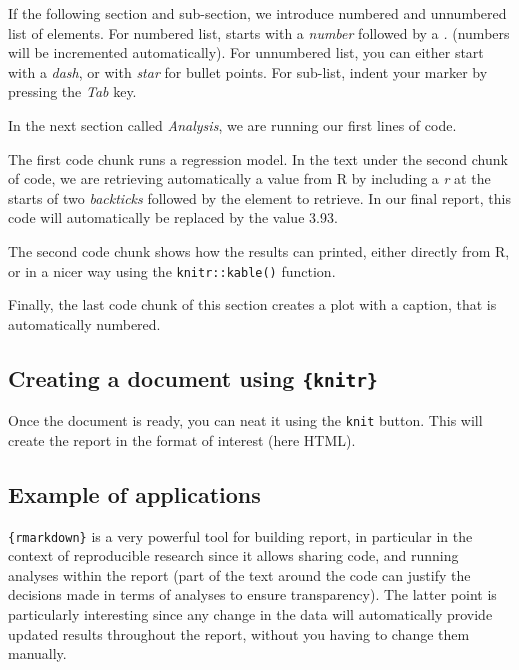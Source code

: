 \documentclass[
]{book}
\begin{document}
If the following section and sub-section, we introduce numbered and unnumbered list of elements. For numbered list, starts with a \emph{number} followed by a \emph{.} (numbers will be incremented automatically). For unnumbered list, you can either start with a \emph{dash}, or with \emph{star} for bullet points. For sub-list, indent your marker by pressing the \emph{Tab} key.

In the next section called \emph{Analysis}, we are running our first lines of code.

The first code chunk runs a regression model. In the text under the second chunk of code, we are retrieving automatically a value from R by including a \emph{r} at the starts of two \emph{backticks} followed by the element to retrieve. In our final report, this code will automatically be replaced by the value 3.93.

The second code chunk shows how the results can printed, either directly from R, or in a nicer way using the \texttt{knitr::kable()} function.

Finally, the last code chunk of this section creates a plot with a caption, that is automatically numbered.

\hypertarget{creating-a-document-using-knitr}{%
\subsection{\texorpdfstring{Creating a document using \texttt{\{knitr\}}}{Creating a document using \{knitr\}}}\label{creating-a-document-using-knitr}}

Once the document is ready, you can neat it using the \texttt{knit} button. This will create the report in the format of interest (here HTML).

\hypertarget{example-of-applications}{%
\subsection{Example of applications}\label{example-of-applications}}

\texttt{\{rmarkdown\}} is a very powerful tool for building report, in particular in the context of reproducible research since it allows sharing code, and running analyses within the report (part of the text around the code can justify the decisions made in terms of analyses to ensure transparency). The latter point is particularly interesting since any change in the data will automatically provide updated results throughout the report, without you having to change them manually.
\end{document}
